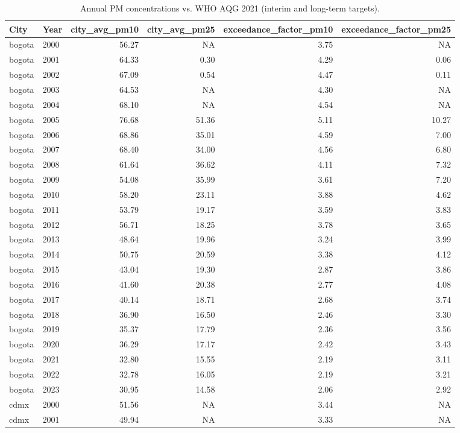 \begin{table}[!htbp]\centering
\caption{Annual PM concentrations vs. WHO AQG 2021 (interim and long-term targets).}
\label{tab:who_exceedances}
\begin{tabular}{ll
rrrr
}
\toprule
City & Year & city_avg_pm10 & city_avg_pm25 & exceedance_factor_pm10 & exceedance_factor_pm25
\\
\midrule
bogota & 2000 & 56.27 &  NA & 3.75 &  NA \\
bogota & 2001 & 64.33 & 0.30 & 4.29 & 0.06 \\
bogota & 2002 & 67.09 & 0.54 & 4.47 & 0.11 \\
bogota & 2003 & 64.53 &  NA & 4.30 &  NA \\
bogota & 2004 & 68.10 &  NA & 4.54 &  NA \\
bogota & 2005 & 76.68 & 51.36 & 5.11 & 10.27 \\
bogota & 2006 & 68.86 & 35.01 & 4.59 & 7.00 \\
bogota & 2007 & 68.40 & 34.00 & 4.56 & 6.80 \\
bogota & 2008 & 61.64 & 36.62 & 4.11 & 7.32 \\
bogota & 2009 & 54.08 & 35.99 & 3.61 & 7.20 \\
bogota & 2010 & 58.20 & 23.11 & 3.88 & 4.62 \\
bogota & 2011 & 53.79 & 19.17 & 3.59 & 3.83 \\
bogota & 2012 & 56.71 & 18.25 & 3.78 & 3.65 \\
bogota & 2013 & 48.64 & 19.96 & 3.24 & 3.99 \\
bogota & 2014 & 50.75 & 20.59 & 3.38 & 4.12 \\
bogota & 2015 & 43.04 & 19.30 & 2.87 & 3.86 \\
bogota & 2016 & 41.60 & 20.38 & 2.77 & 4.08 \\
bogota & 2017 & 40.14 & 18.71 & 2.68 & 3.74 \\
bogota & 2018 & 36.90 & 16.50 & 2.46 & 3.30 \\
bogota & 2019 & 35.37 & 17.79 & 2.36 & 3.56 \\
bogota & 2020 & 36.29 & 17.17 & 2.42 & 3.43 \\
bogota & 2021 & 32.80 & 15.55 & 2.19 & 3.11 \\
bogota & 2022 & 32.78 & 16.05 & 2.19 & 3.21 \\
bogota & 2023 & 30.95 & 14.58 & 2.06 & 2.92 \\
cdmx & 2000 & 51.56 &  NA & 3.44 &  NA \\
cdmx & 2001 & 49.94 &  NA & 3.33 &  NA \\

\end{tabular}
\end{table}
